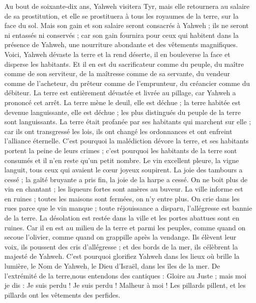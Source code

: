 \begin{multicols}{2}
Au bout de soixante-dix ans, Yahweh visitera Tyr, mais elle retournera au salaire de sa prostitution, et elle se prostituera à tous les royaumes de la terre, sur la face du sol.
Mais son gain et son salaire seront consacrés à Yahweh ; ils ne seront ni entassés ni conservés ; car son gain fournira pour ceux qui habitent dans la présence de Yahweh, une nourriture abondante et des vêtements magnifiques.
\VerseOne{}Voici, Yahweh dévaste la terre et la rend déserte, il en bouleverse la face et disperse les habitants.
Et il en est du sacrificateur comme du peuple, du maître comme de son serviteur, de la maîtresse comme de sa servante, du vendeur comme de l'acheteur, du prêteur comme de l'emprunteur, du créancier comme du débiteur.
La terre est entièrement dévastée et livrée au pillage, car Yahweh a prononcé cet arrêt.
La terre mène le deuil, elle est déchue ; la terre habitée est devenue languissante, elle est déchue ; les plus distingués du peuple de la terre sont languissants.
La terre était profanée par ses habitants qui marchent sur elle ; car ils ont transgressé les lois, ils ont changé les ordonnances et ont enfreint l'alliance éternelle.
C'est pourquoi la malédiction dévore la terre, et ses habitants portent la peine de leurs crimes ; c'est pourquoi les habitants de la terre sont consumés et il n'en reste qu'un petit nombre.
Le vin excellent pleure, la vigne languit, tous ceux qui avaient le cœur joyeux soupirent.
La joie des tambours a cessé ; la gaîté bruyante a pris fin, la joie de la harpe a cessé.
On ne boit plus de vin en chantant ; les liqueurs fortes sont amères au buveur.
La ville informe est en ruines ; toutes les maisons sont fermées, on n'y entre plus.
On crie dans les rues parce que le vin manque ; toute réjouissance a disparu, l'allégresse est bannie de la terre.
La désolation est restée dans la ville et les portes abattues sont en ruines.
Car il en est au milieu de la terre et parmi les peuples, comme quand on secoue l'olivier, comme quand on grappille après la vendange.
Ils élèvent leur voix, ils poussent des cris d'allégresse ; et des bords de la mer, ils célèbrent la majesté de Yahweh.
C'est pourquoi glorifiez Yahweh dans les lieux où brille la lumière, le Nom de Yahweh, le Dieu d'Israël, dans les îles de la mer.
De l'extrémité de la terre,nous entendons des cantiques : Gloire au Juste ; mais moi je dis : Je suis perdu ! Je suis perdu ! Malheur à moi ! Les pillards pillent, et les pillards ont les vêtements des perfides.

\end{multicols}
